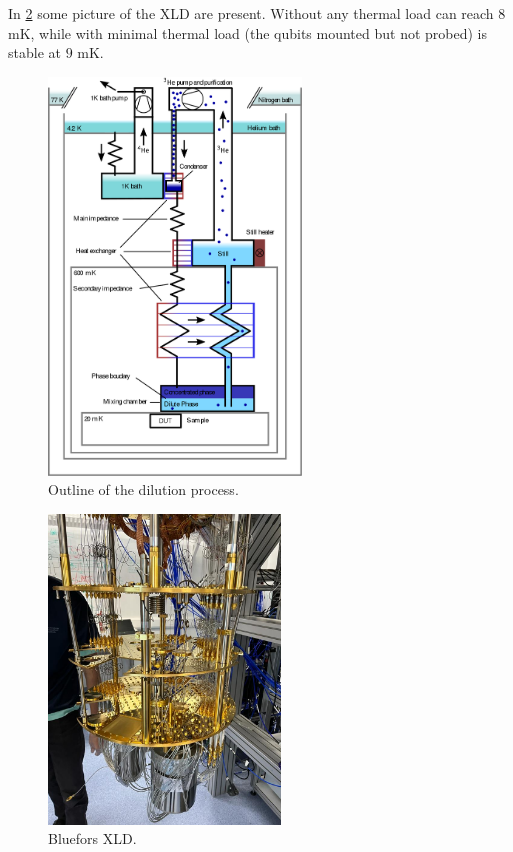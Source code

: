 In \cref{fig:xldcryostat} some picture of the XLD are present.
Without any thermal load can reach $8$ mK, while with minimal thermal load (the qubits mounted but not probed) is stable at $9$ mK.

\begin{figure}[H]
    \centering
    \includegraphics[width=0.6\textwidth]{Setup-software/figures/dilution_refrigerator.png}
    \caption{Outline of the dilution process.}
    \label{fig:cryostat:heliumdilutionrefrigerator}
\end{figure}


\begin{figure}[ht]
    \centering
    \includegraphics[width=0.55\textwidth]{Setup-software/figures/XLD.jpeg}
    \caption{Bluefors XLD.}
    \label{fig:xldcryostat}
\end{figure}

